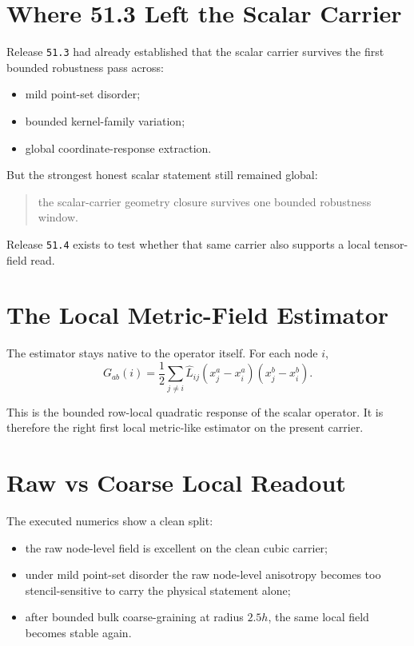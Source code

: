 \documentclass[11pt]{article}
\begin{document}
\section{Where 51.3 Left the Scalar Carrier}

Release \texttt{51.3} had already established that the scalar carrier survives the first bounded robustness pass across:
\begin{itemize}
\item mild point-set disorder;
\item bounded kernel-family variation;
\item global coordinate-response extraction.
\end{itemize}

But the strongest honest scalar statement still remained global:

\begin{quote}
the scalar-carrier geometry closure survives one bounded robustness window.
\end{quote}

Release \texttt{51.4} exists to test whether that same carrier also supports a local tensor-field read.

\section{The Local Metric-Field Estimator}

The estimator stays native to the operator itself. For each node \(i\),
\[
G_{ab}(i) = \frac{1}{2} \sum_{j \neq i} \widehat{L}_{ij} (x_j^a - x_i^a)(x_j^b - x_i^b).
\]

This is the bounded row-local quadratic response of the scalar operator. It is therefore the right first local metric-like estimator on the present carrier.

\section{Raw vs Coarse Local Readout}

The executed numerics show a clean split:
\begin{itemize}
\item the raw node-level field is excellent on the clean cubic carrier;
\item under mild point-set disorder the raw node-level anisotropy becomes too stencil-sensitive to carry the physical statement alone;
\item after bounded bulk coarse-graining at radius \(2.5 h\), the same local field becomes stable again.
\end{itemize}
\end{document}
